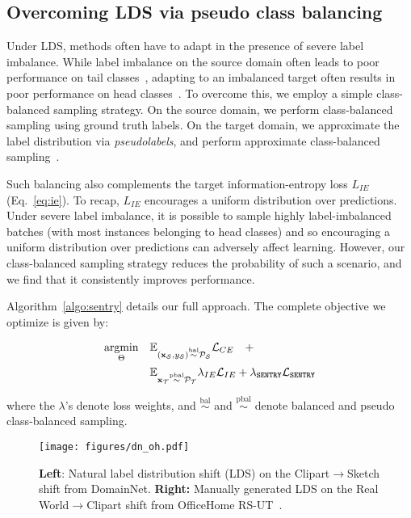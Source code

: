 \documentclass[10pt,twocolumn,letterpaper]{article}
\newcommand{\method}{\texttt{SENTRY}\xspace}
\newcommand{\source}{\mathcal{S}}  \newcommand{\target}{\mathcal{T}}  \newcommand{\numsamples}{N}
\DeclareMathOperator*{\argmin}{argmin}
\begin{document}
\subsection{Overcoming LDS via pseudo class balancing} 
\label{sec:pcb}

Under LDS, methods often have to adapt in the presence of severe label imbalance. While label imbalance on the source domain often leads to poor performance on tail classes~\cite{cui2019class,wang2017learning}, adapting to an imbalanced target often results in poor performance on head classes~\cite{li2020rethinking,wu2019domain}. To overcome this, we employ a simple class-balanced sampling strategy. On the source domain, we perform class-balanced sampling using ground truth labels. On the target domain, we approximate the label distribution via \emph{pseudolabels}, and perform approximate class-balanced sampling~\cite{zou2018unsupervised}. 

Such balancing also complements the target information-entropy loss $L_{IE}$~\cite{li2020rethinking} (Eq.~\ref{eq:ie}). To recap, $L_{IE}$ encourages a uniform distribution over predictions. Under severe label imbalance, it is possible to sample highly label-imbalanced batches (with most instances belonging to head classes) and so encouraging a uniform distribution over predictions can adversely affect learning. However, our class-balanced sampling strategy reduces the probability of such a scenario, and we find that it consistently improves performance.

Algorithm~\ref{algo:sentry} details our full approach. The complete objective we optimize is given by:

\vspace{-10pt}
\begin{equation}
    \vspace{-10pt}
    \begin{aligned}    
    \argmin_{\modelparams} \quad & \mathbb{E}_{(\mathbf{x}_\source, y_\source) \stackrel{\text{bal}}{\sim} \mathcal{P}_\source} \mathcal{L}_{CE} \quad+ \\
    & \mathbb{E}_{\mathbf{x}_\target \stackrel{\text{pbal}}{\sim} \mathcal{P}_\target} \lambda_{IE} \mathcal{L}_{IE} + \lambda_{\method} \mathcal{L}_{\method}
    \end{aligned}    
    \end{equation}

\noindent where the $\lambda$'s denote loss weights, and $\stackrel{\text{bal}}{\sim}$ and $\stackrel{\text{pbal}}{\sim}$ denote balanced and pseudo class-balanced sampling. \begin{figure*}[t]
    \centering
    \vspace{-3pt}
    \texttt{[image: figures/dn\_oh.pdf]}
    \vspace*{-17pt}
    \caption{
    \textbf{Left}: Natural label distribution shift (LDS) on the Clipart$\rightarrow$Sketch shift from DomainNet. \textbf{Right:} Manually generated LDS on the Real World$\rightarrow$Clipart shift from OfficeHome RS-UT~\cite{tan2019generalized}.
    }
    \vspace*{-7pt}
    \label{fig:dn_oh}
 \end{figure*}
\end{document}
